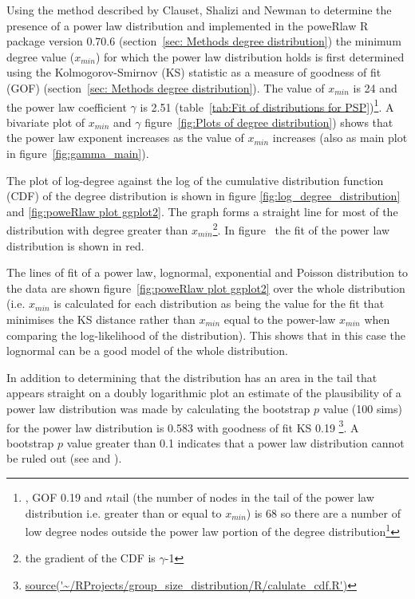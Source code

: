 Using the method described by Clauset, Shalizi and Newman \cite{clauset2009power} to determine the presence of a power law distribution and implemented in the poweRlaw R package version 0.70.6 \cite{gillespie2015fitting} (section~\ref{sec: Methods degree distribution}) the minimum degree value ($x_{min}$) for which the power law distribution holds is first determined using the Kolmogorov-Smirnov (KS) statistic as a measure of goodness of fit (GOF) (section~\ref{sec: Methods degree distribution}). The value of $x_{min}$ is 24 and the power law coefficient $\gamma$ is 2.51 (table~\ref{tab:Fit of distributions for PSP})\footnote{, GOF 0.19 and  $n$tail (the number of nodes in the tail of the power law distribution i.e. greater than or equal to $x_{min}$) is 68 so there are a number of low degree  nodes outside the power law portion of the degree distribution\footnote{\url{source('~/RProjects/group_size_distribution/R/calulate_cdf.R')}}}. A bivariate plot of $x_{min}$ and $\gamma$ figure~\ref{fig:Plots of degree distribution}) shows that the power law exponent increases as the value of $x_{min}$ increases (also as main plot in figure~\ref{fig:gamma_main}).

The plot of log-degree against the log of the cumulative distribution function (CDF) of the degree distribution is shown in figure \ref{fig:log_degree_distribution} and  \ref{fig:poweRlaw plot ggplot2}. The graph forms a straight line for most of the distribution with degree greater than $x_{min}$\footnote{the gradient of the CDF is $\gamma$-1}. In figure~\label{fig:poweRlaw plot ggplot2} the fit of the power law distribution is shown in red. 

The lines of fit of a power law, lognormal, exponential and Poisson distribution to the data are shown figure~\ref{fig:poweRlaw plot ggplot2} over the whole distribution (i.e. $x_{min}$ is calculated for each distribution as being the value for the fit that minimises the KS distance rather than $x_{min}$ equal to the power-law $x_{min}$ when comparing the log-likelihood of the distribution). This shows that in this case the lognormal can be a good model of the whole distribution.

In addition to determining that the distribution has an area in the tail that appears straight on a doubly logarithmic plot an estimate of the plausibility of a power law distribution was made by calculating the bootstrap $p$ value (100 sims) for the power law distribution is 0.583 with goodness of fit KS 0.19 \footnote{\url{source('~/RProjects/group_size_distribution/R/calulate_cdf.R')}}. A bootstrap $p$ value greater than 0.1 indicates that a power law distribution cannot be ruled out (see \cite{gillespie2015fitting} and \cite{clauset2009power}).



